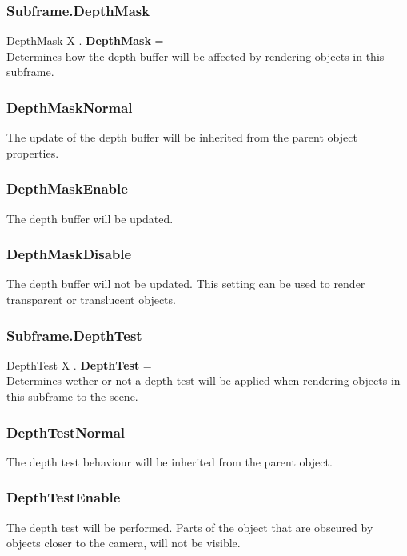 \subsubsection{Subframe.DepthMask \label{F:Subframe:DepthMask}}
DepthMask X . \textbf{DepthMask} = \\
Determines how the depth buffer will be affected by rendering objects in this subframe.


\subsubsection{DepthMaskNormal \label{T:DepthMask|DepthMaskNormal}}
The update of the depth buffer will be inherited from the parent object properties.

\subsubsection{DepthMaskEnable \label{T:DepthMask|DepthMaskEnable}}
The depth buffer will be updated.

\subsubsection{DepthMaskDisable \label{T:DepthMask|DepthMaskDisable}}
The depth buffer will not be updated. This setting can be used to render transparent or translucent objects.

\subsubsection{Subframe.DepthTest \label{F:Subframe:DepthTest}}
DepthTest X . \textbf{DepthTest} = \\
Determines wether or not a depth test will be applied when rendering objects in this subframe to the scene.

\subsubsection{DepthTestNormal \label{T:DepthTest|DepthTestNormal}}
The depth test behaviour will be inherited from the parent object.

\subsubsection{DepthTestEnable \label{T:DepthTest|DepthTestEnable}}
The depth test will be performed. Parts of the object that are obscured by objects closer to the camera, will not be visible.

